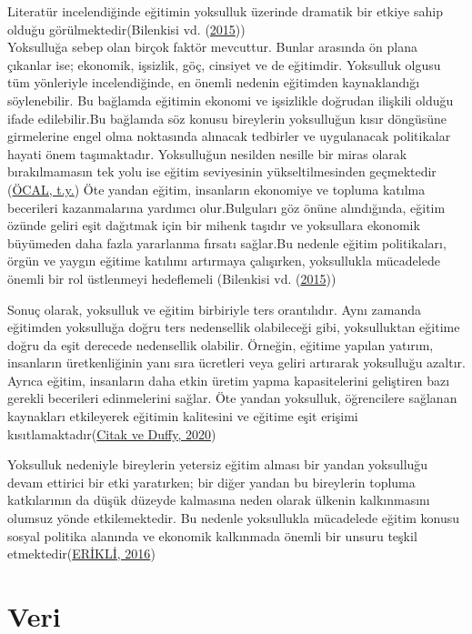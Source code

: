 \documentclass[
  12pt,
]{article}
\begin{document}
Literatür incelendiğinde eğitimin yoksulluk üzerinde dramatik bir etkiye sahip olduğu görülmektedir(Bilenkisi vd. (\protect\hyperlink{ref-bilenkisi2015impact}{2015}))\\
Yoksulluğa sebep olan birçok faktör mevcuttur. Bunlar arasında ön plana çıkanlar ise; ekonomik, işsizlik, göç, cinsiyet ve de eğitimdir. Yoksulluk olgusu tüm yönleriyle incelendiğinde, en önemli nedenin eğitimden kaynaklandığı söylenebilir. Bu bağlamda eğitimin ekonomi ve işsizlikle doğrudan ilişkili olduğu ifade edilebilir.Bu bağlamda söz konusu bireylerin yoksulluğun kısır döngüsüne girmelerine engel olma noktasında alınacak tedbirler ve uygulanacak politikalar hayati önem taşımaktadır. Yoksulluğun nesilden nesille bir miras olarak bırakılmamasın tek yolu ise eğitim seviyesinin yükseltilmesinden geçmektedir (\protect\hyperlink{ref-ocalguncel}{ÖCAL, t.y.})
Öte yandan eğitim, insanların ekonomiye ve topluma katılma becerileri kazanmalarına yardımcı olur.Bulguları göz önüne alındığında, eğitim özünde geliri eşit dağıtmak için bir mihenk taşıdır ve yoksullara ekonomik büyümeden daha fazla yararlanma fırsatı sağlar.Bu nedenle eğitim politikaları, örgün ve yaygın eğitime katılımı artırmaya çalışırken, yoksullukla mücadelede önemli bir rol üstlenmeyi hedeflemeli (Bilenkisi vd. (\protect\hyperlink{ref-bilenkisi2015impact}{2015}))

Sonuç olarak, yoksulluk ve eğitim birbiriyle ters orantılıdır.
Aynı zamanda eğitimden yoksulluğa doğru ters nedensellik olabileceği gibi, yoksulluktan eğitime doğru da eşit derecede nedensellik olabilir. Örneğin, eğitime yapılan yatırım, insanların üretkenliğinin yanı sıra ücretleri veya geliri artırarak yoksulluğu azaltır. Ayrıca eğitim, insanların daha etkin üretim yapma kapasitelerini geliştiren bazı gerekli becerileri edinmelerini sağlar. Öte yandan yoksulluk, öğrencilere sağlanan kaynakları etkileyerek eğitimin kalitesini ve eğitime eşit erişimi kısıtlamaktadır(\protect\hyperlink{ref-citak2020causal}{Citak ve Duffy, 2020})

Yoksulluk nedeniyle bireylerin yetersiz eğitim alması bir yandan yoksulluğu devam ettirici bir etki yaratırken; bir diğer yandan bu bireylerin topluma katkılarının da düşük düzeyde kalmasına neden olarak ülkenin kalkınmasını olumsuz yönde etkilemektedir. Bu nedenle yoksullukla mücadelede eğitim konusu sosyal politika alanında ve ekonomik kalkınmada önemli bir unsuru teşkil etmektedir(\protect\hyperlink{ref-erikli2016gencc}{ERİKLİ, 2016})

\hypertarget{veri}{%
\section{Veri}\label{veri}}
\end{document}
